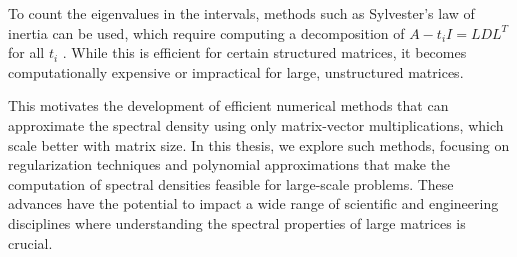 To count the eigenvalues in the intervals, methods such as Sylvester's law of inertia can be used,
which require computing a decomposition of $A - t_i I = LDL^T$ for all $t_i$ \cite{golub2013matrix}.
While this is efficient for certain structured matrices,
it becomes computationally expensive or impractical for large, unstructured matrices.

This motivates the development of efficient numerical methods that can approximate the spectral density
using only matrix-vector multiplications, which scale better with matrix size.
In this thesis, we explore such methods, focusing on regularization techniques and polynomial approximations
that make the computation of spectral densities feasible for large-scale problems.
These advances have the potential to impact a wide range of scientific and engineering disciplines
where understanding the spectral properties of large matrices is crucial.